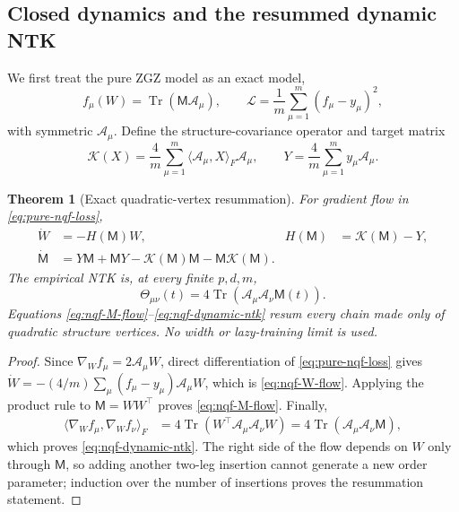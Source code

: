 \documentclass{article}
\newtheorem{theorem}{Theorem}[section]
\newcommand{\Tr}{\operatorname{Tr}}
\begin{document}
\subsection{Closed dynamics and the resummed dynamic NTK}

We first treat the pure ZGZ model as an exact model,
\begin{equation}
f_\mu(W)=\Tr(\mathsf M\mathscr A_\mu),\qquad
\mathcal L=\frac1m\sum_{\mu=1}^m(f_\mu-y_\mu)^2,
\label{eq:pure-nqf-loss}
\end{equation}
with symmetric \(\mathscr A_\mu\).  Define the structure-covariance operator
and target matrix
\begin{equation}
\mathscr K(X)=\frac4m\sum_{\mu=1}^m
\langle\mathscr A_\mu,X\rangle_F\mathscr A_\mu,
\qquad
Y=\frac4m\sum_{\mu=1}^my_\mu\mathscr A_\mu.
\label{eq:nqf-K-Y}
\end{equation}

\begin{theorem}[Exact quadratic-vertex resummation]
\label{thm:nqf-resummation}
For gradient flow in \eqref{eq:pure-nqf-loss},
\begin{align}
\dot W&=-H(\mathsf M)W,
&H(\mathsf M)&=\mathscr K(\mathsf M)-Y,
\label{eq:nqf-W-flow}\\
\dot{\mathsf M}
&=Y\mathsf M+\mathsf MY
-\mathscr K(\mathsf M)\mathsf M-\mathsf M\mathscr K(\mathsf M).
\label{eq:nqf-M-flow}
\end{align}
The empirical NTK is, at every finite \(p,d,m\),
\begin{equation}
\Theta_{\mu\nu}(t)
=4\Tr(\mathscr A_\mu\mathscr A_\nu\mathsf M(t)).
\label{eq:nqf-dynamic-ntk}
\end{equation}
Equations \eqref{eq:nqf-M-flow}--\eqref{eq:nqf-dynamic-ntk} resum every
chain made only of quadratic structure vertices.  No width or lazy-training
limit is used.
\end{theorem}

\begin{proof}
Since \(\nabla_Wf_\mu=2\mathscr A_\mu W\), direct differentiation of
\eqref{eq:pure-nqf-loss} gives
\(\dot W=-(4/m)\sum_\mu(f_\mu-y_\mu)\mathscr A_\mu W\), which is
\eqref{eq:nqf-W-flow}.  Applying the product rule to
\(\mathsf M=WW^\top\) proves \eqref{eq:nqf-M-flow}.  Finally,
\begin{align*}
\langle\nabla_Wf_\mu,\nabla_Wf_\nu\rangle_F
&=4\Tr(W^\top\mathscr A_\mu\mathscr A_\nu W)
=4\Tr(\mathscr A_\mu\mathscr A_\nu\mathsf M),
\end{align*}
which proves \eqref{eq:nqf-dynamic-ntk}.  The right side of the flow depends
on \(W\) only through \(\mathsf M\), so adding another two-leg insertion
cannot generate a new order parameter; induction over the number of
insertions proves the resummation statement.
\end{proof}
\end{document}
